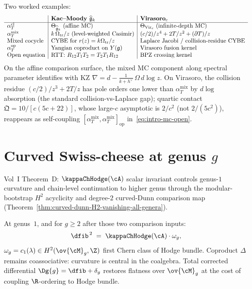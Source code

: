 Two worked examples:
\[
\begin{array}{l|l|l}
 & \textbf{Kac--Moody } \widehat{\fg}_k &
 \textbf{Virasoro}_c \\
\hline
\alpha_T^{\mathrm{cl}} & \Theta_{\widehat{\fg}_k}\ (\text{affine MC}) &
 \Theta_{\mathrm{Vir}_c}\ (\text{infinite-depth MC}) \\
\alpha_T^{\mathrm{mix}} & k\,\Omega_{\mathrm{tr}}/z\ (\text{level-weighted Casimir}) &
 (c/2)/z^4 + 2T/z^2 + (\partial T)/z \\
\text{Mixed cocycle} &
 \text{CYBE for } r(z) = k\Omega_{\mathrm{tr}}/z &
 \text{Laplace Jacobi / collision-residue CYBE} \\
\alpha_T^{\mathrm{op}} &
 \text{Yangian coproduct on } Y(\fg) &
 \text{Virasoro fusion kernel} \\
\text{Open equation} &
 \text{RTT: } R_{12}T_1T_2 = T_2T_1R_{12} &
 \text{BPZ crossing kernel}
\end{array}
\]
On the affine comparison surface, the mixed MC component along
spectral parameter identifies with KZ
$\nabla = d - \frac{1}{k+h^\vee}\,\Omega\,d\log z$. On Virasoro,
the collision residue $(c/2)/z^3 + 2T/z$ has pole orders
one lower than $\alpha_T^{\mathrm{mix}}$ by $d\log$ absorption
(the standard collision-vs-Laplace gap);
quartic contact $\mathfrak{Q} = 10/[c(5c+22)]$, whose large-$c$
asymptotic is $2/c^2$ (not $2/(5c^2)$), reappears as
self-coupling
$[\alpha_T^{\mathrm{mix}},\alpha_T^{\mathrm{mix}}]_{\mathrm{op}}$
in~\eqref{eq:intro-mc-open}.

\section*{Curved Swiss-cheese at genus $g$}

Vol~I Theorem~D: $\kappaChHodge(\cA)$ scalar invariant
controls genus-$1$ curvature and chain-level continuation to
higher genus through the modular-bootstrap $H^2$ acyclicity and
degree-$2$ curved-Dunn comparison map
(Theorem~\ref{thm:curved-dunn-H2-vanishing-all-genera}).

At genus~$1$, and for $g \ge 2$ after those two comparison inputs:
\begin{equation}
\label{eq:intro-curvature}
\dfib^{\,2} \;=\; \kappaChHodge(\cA) \cdot \omega_g,
\end{equation}
$\omega_g = c_1(\lambda) \in H^2(\ov{\cM}_g, \Z)$ first Chern
class of Hodge bundle. Coproduct $\Delta$ remains coassociative:
curvature is central in the coalgebra. Total corrected
differential $\Dg{g} = \dfib + \delta_g$ restores flatness over
$\ov{\cM}_g$ at the cost of coupling $\R$-ordering to Hodge
bundle.

